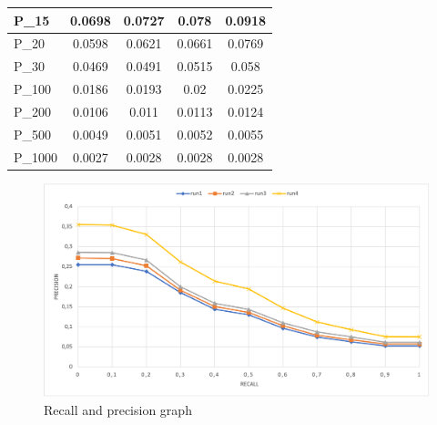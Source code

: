 \begin{table}[h!]
\begin{tabular}{ |l|c|c|c|c| }
        P\_15 & 0.0698 & 0.0727 & 0.078 & 0.0918 \\ \hline
        P\_20 & 0.0598 & 0.0621 & 0.0661 & 0.0769 \\ \hline
        P\_30 & 0.0469 & 0.0491 & 0.0515 & 0.058 \\ \hline
        P\_100 & 0.0186 & 0.0193 & 0.02 & 0.0225 \\ \hline
        P\_200 & 0.0106 & 0.011 & 0.0113 & 0.0124 \\ \hline
        P\_500 & 0.0049 & 0.0051 & 0.0052 & 0.0055 \\ \hline
        P\_1000 & 0.0027 & 0.0028 & 0.0028 & 0.0028 \\ \hline
    \end{tabular}
\end{table}




\begin{figure}[h!]
    \includegraphics[width=\textwidth]{figure/rp_eng.png}
    \caption{Recall and precision graph}
    \label{fig:rp_english}
  \end{figure}